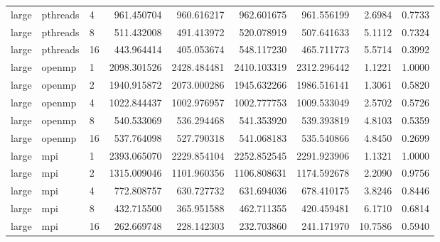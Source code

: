 \begin{longtable}{lllrrrrrr}
large & pthreads & 4 & 961.450704 & 960.616217 & 962.601675 & 961.556199 & 2.6984 & 0.7733 \\
large & pthreads & 8 & 511.432008 & 491.413972 & 520.078919 & 507.641633 & 5.1112 & 0.7324 \\
large & pthreads & 16 & 443.964414 & 405.053674 & 548.117230 & 465.711773 & 5.5714 & 0.3992 \\
large & openmp & 1 & 2098.301526 & 2428.484481 & 2410.103319 & 2312.296442 & 1.1221 & 1.0000 \\
large & openmp & 2 & 1940.915872 & 2073.000286 & 1945.632266 & 1986.516141 & 1.3061 & 0.5820 \\
large & openmp & 4 & 1022.844437 & 1002.976957 & 1002.777753 & 1009.533049 & 2.5702 & 0.5726 \\
large & openmp & 8 & 540.533069 & 536.294468 & 541.353920 & 539.393819 & 4.8103 & 0.5359 \\
large & openmp & 16 & 537.764098 & 527.790318 & 541.068183 & 535.540866 & 4.8450 & 0.2699 \\
large & mpi & 1 & 2393.065070 & 2229.854104 & 2252.852545 & 2291.923906 & 1.1321 & 1.0000 \\
large & mpi & 2 & 1315.009046 & 1101.960356 & 1106.808631 & 1174.592678 & 2.2090 & 0.9756 \\
large & mpi & 4 & 772.808757 & 630.727732 & 631.694036 & 678.410175 & 3.8246 & 0.8446 \\
large & mpi & 8 & 432.715500 & 365.951588 & 462.711355 & 420.459481 & 6.1710 & 0.6814 \\
large & mpi & 16 & 262.669748 & 228.142303 & 232.703860 & 241.171970 & 10.7586 & 0.5940 \\
\end{longtable}\normalsize
